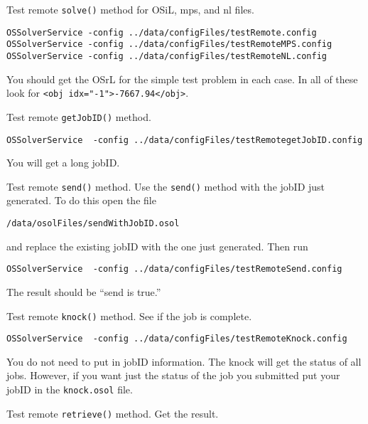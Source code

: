 \begin{itemize}
\begin{itemize}
 Test remote {\tt solve()} method for OSiL, mps, and nl files.



\begin{verbatim}
OSSolverService -config ../data/configFiles/testRemote.config
OSSolverService -config ../data/configFiles/testRemoteMPS.config
OSSolverService -config ../data/configFiles/testRemoteNL.config
\end{verbatim}


You should get the OSrL for the simple test problem in each case.  In all of these look for {\tt <obj idx="-1">-7667.94</obj>}.

\vskip 10pt


 Test remote {\tt getJobID()} method.


\begin{verbatim}
OSSolverService  -config ../data/configFiles/testRemotegetJobID.config
\end{verbatim}



You will get a long jobID.


\vskip 10pt


 Test remote {\tt send()} method. Use the {\tt send()} method with the jobID just  generated.  To do this open the file
\begin{verbatim}
/data/osolFiles/sendWithJobID.osol
\end{verbatim}
and replace the existing jobID with the one just generated.  Then run
\begin{verbatim}
OSSolverService  -config ../data/configFiles/testRemoteSend.config
\end{verbatim}
The result should be ``send is true.''

\vskip 10pt

 Test remote {\tt knock()} method.  See if the  job is complete.


\begin{verbatim}
OSSolverService  -config ../data/configFiles/testRemoteKnock.config
\end{verbatim}

You do not need to put in jobID information. The knock will get the status of all jobs. However, if you want just the status of the job you submitted put your jobID in the {\tt knock.osol} file. 

\vskip 10pt

 Test remote {\tt retrieve()} method. Get the result.


\end{itemize}
\end{itemize}
